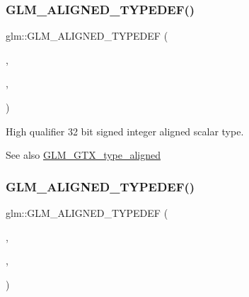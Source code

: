 \subsubsection{\texorpdfstring{G\+L\+M\+\_\+\+A\+L\+I\+G\+N\+E\+D\+\_\+\+T\+Y\+P\+E\+D\+E\+F()}{GLM\_ALIGNED\_TYPEDEF()}\hspace{0.1cm}{\footnotesize\ttfamily [27/209]}}
{\footnotesize\ttfamily glm\+::\+G\+L\+M\+\_\+\+A\+L\+I\+G\+N\+E\+D\+\_\+\+T\+Y\+P\+E\+D\+EF (\begin{DoxyParamCaption}\item[{\mbox{\hyperlink{group__gtc__type__precision_gaa2045c92b9553d463191af6a20e997bb}{highp\+\_\+int32}}}]{,  }\item[{aligned\+\_\+highp\+\_\+int32}]{,  }\item[{4}]{ }\end{DoxyParamCaption})}

High qualifier 32 bit signed integer aligned scalar type. \begin{DoxySeeAlso}{See also}
\mbox{\hyperlink{group__gtx__type__aligned}{G\+L\+M\+\_\+\+G\+T\+X\+\_\+type\+\_\+aligned}} 
\end{DoxySeeAlso}
\mbox{\label{group__gtx__type__aligned_ga46bbf08dc004d8c433041e0b5018a5d3}} 
\subsubsection{\texorpdfstring{G\+L\+M\+\_\+\+A\+L\+I\+G\+N\+E\+D\+\_\+\+T\+Y\+P\+E\+D\+E\+F()}{GLM\_ALIGNED\_TYPEDEF()}\hspace{0.1cm}{\footnotesize\ttfamily [28/209]}}
{\footnotesize\ttfamily glm\+::\+G\+L\+M\+\_\+\+A\+L\+I\+G\+N\+E\+D\+\_\+\+T\+Y\+P\+E\+D\+EF (\begin{DoxyParamCaption}\item[{\mbox{\hyperlink{group__gtc__type__precision_ga7ffb27943e9569800979081bc548621c}{highp\+\_\+int64}}}]{,  }\item[{aligned\+\_\+highp\+\_\+int64}]{,  }\item[{8}]{ }\end{DoxyParamCaption})}

